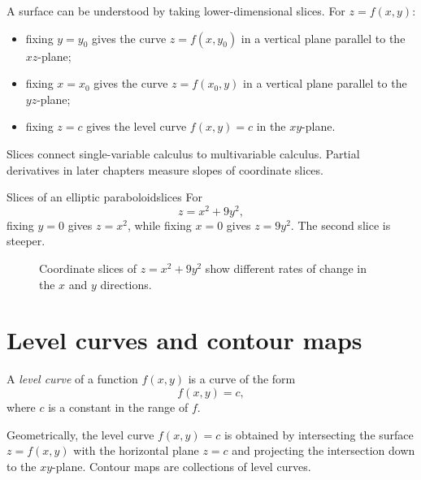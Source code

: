 \documentclass[11pt]{article}
\begin{document}
A surface can be understood by taking lower-dimensional slices. For $z=f(x,y)$:
\begin{itemize}
  \item fixing $y=y_0$ gives the curve $z=f(x,y_0)$ in a vertical plane parallel to the $xz$-plane;
  \item fixing $x=x_0$ gives the curve $z=f(x_0,y)$ in a vertical plane parallel to the $yz$-plane;
  \item fixing $z=c$ gives the level curve $f(x,y)=c$ in the $xy$-plane.
\end{itemize}
Slices connect single-variable calculus to multivariable calculus. Partial derivatives in later chapters measure slopes of coordinate slices.

\begin{workedexample}{Slices of an elliptic paraboloid}{slices}
For
\[
z=x^2+9y^2,
\]
fixing $y=0$ gives $z=x^2$, while fixing $x=0$ gives $z=9y^2$. The second slice is steeper.
\end{workedexample}

\begin{figure}[H]
\centering
{}
\caption{Coordinate slices of $z=x^2+9y^2$ show different rates of change in the $x$ and $y$ directions.}
\end{figure}

\section{Level curves and contour maps}

A \emph{level curve} of a function $f(x,y)$ is a curve of the form
\[
f(x,y)=c,
\]
where $c$ is a constant in the range of $f$.

Geometrically, the level curve $f(x,y)=c$ is obtained by intersecting the surface $z=f(x,y)$ with the horizontal plane $z=c$ and projecting the intersection down to the $xy$-plane. Contour maps are collections of level curves.
\end{document}
